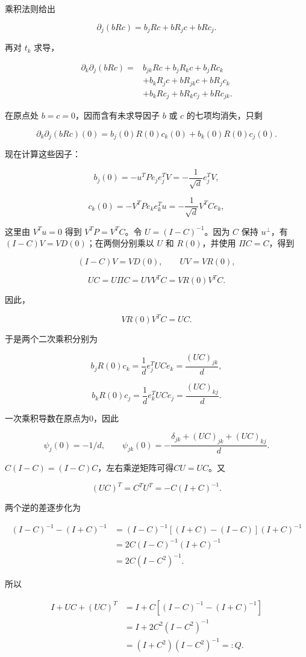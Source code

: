 \documentclass[11pt,a4paper]{article}
\begin{document}
乘积法则给出

\[
\partial_j(bRc)=b_jRc+bR_jc+bRc_j.
\]

再对 \(t_k\) 求导，

\[
\begin{aligned}
\partial_k\partial_j(bRc)
={}&b_{jk}Rc+b_jR_kc+b_jRc_k\\
&+b_kR_jc+bR_{jk}c+bR_jc_k\\
&+b_kRc_j+bR_kc_j+bRc_{jk}.
\end{aligned}
\]

在原点处 \(b=c=0\)，因而含有未求导因子 \(b\) 或 \(c\) 的七项均消失，只剩

\[
\partial_k\partial_j(bRc)(0)=b_j(0)R(0)c_k(0)+b_k(0)R(0)c_j(0).
\]

现在计算这些因子：

\[
b_j(0)=-u^TPe_je_j^TV
=-\frac1{\sqrt d}e_j^TV,
\]

\[
c_k(0)=-V^TPe_ke_k^Tu
=-\frac1{\sqrt d}V^TCe_k,
\]

这里由 \(V^Tu=0\) 得到 \(V^TP=V^TC\)。令 \(U=(I-C)^{-1}\)。因为 \(C\) 保持 \(u^\perp\)，有 \((I-C)V=VD(0)\)；在两侧分别乘以 \(U\) 和 \(R(0)\)，并使用 \(\Pi C=C\)，得到

\[
(I-C)V=VD(0),\qquad UV=VR(0),
\]

\[
UC=U\Pi C=UVV^TC=VR(0)V^TC.
\]

因此，

\[
VR(0)V^TC=UC.
\]

于是两个二次乘积分别为

\[
b_jR(0)c_k=\frac1d e_j^TUC e_k=\frac{(UC)_{jk}}d,
\]

\[
b_kR(0)c_j=\frac1d e_k^TUC e_j=\frac{(UC)_{kj}}d.
\]

一次乘积导数在原点为0，因此

\[
\psi_j(0)=-1/d,\qquad
\psi_{jk}(0)=-\frac{\delta_{jk}+(UC)_{jk}+(UC)_{kj}}d.
\]

\(C(I-C)=(I-C)C\)，左右乘逆矩阵可得\(CU=UC\)。又

\[
(UC)^T=C^TU^T=-C(I+C)^{-1}.
\]

两个逆的差逐步化为

\[
\begin{aligned}
(I-C)^{-1}-(I+C)^{-1}
&=(I-C)^{-1}[(I+C)-(I-C)](I+C)^{-1}\\
&=2C(I-C)^{-1}(I+C)^{-1}\\
&=2C(I-C^2)^{-1}.
\end{aligned}
\]

所以

\[
\begin{aligned}
I+UC+(UC)^T
&=I+C[(I-C)^{-1}-(I+C)^{-1}]\\
&=I+2C^2(I-C^2)^{-1}\\
&=(I+C^2)(I-C^2)^{-1}=:Q.
\end{aligned}
\]
\end{document}
